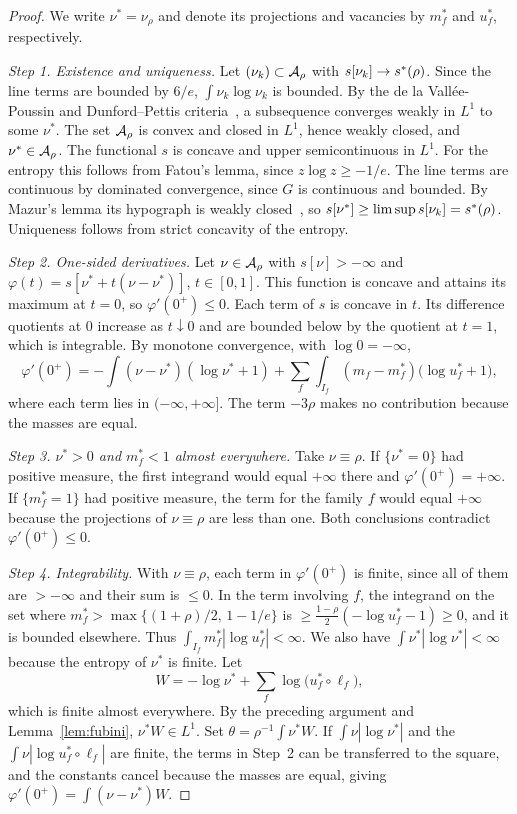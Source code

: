 \begin{proof} We write $\nu^*=\nu_\rho$ and denote its projections and vacancies by $m^*_f$ and $u^*_f$, respectively.

\emph{Step 1. Existence and uniqueness.} Let $(\nu_k)\subset{\mathcal{A}}_\rho$ with $s[\nu_k]\to s^{*}(\rho)$. Since the line terms are bounded
by $6/e$, $\int\nu_k\log\nu_k$ is bounded. By the de la Vallée-Poussin and Dunford--Pettis criteria~\cite{Bogachev}, a subsequence
converges weakly in $L^1$ to some $\nu^*$. The set ${\mathcal{A}}_\rho$ is convex and closed in $L^1$, hence weakly closed, and
$\nu^*\in{\mathcal{A}}_\rho$. The functional $s$ is concave and upper semicontinuous in $L^1$. For the entropy this follows from Fatou's lemma,
since $z\log z\ge-1/e$. The line terms are continuous by dominated convergence, since $G$ is continuous and bounded. By Mazur's lemma
its hypograph is weakly closed~\cite{Brezis}, so $s[\nu^*]\ge\limsup s[\nu_k]=s^{*}(\rho)$. Uniqueness follows from strict concavity of
the entropy.

\emph{Step 2. One-sided derivatives.} Let $\nu\in{\mathcal{A}}_\rho$ with $s[\nu]>-\infty$ and $\varphi(t)=s[\nu^*+t(\nu-\nu^*)]$, $t\in[0,1]$.
This function is concave and attains its maximum at $t=0$, so $\varphi'(0^+)\le0$. Each term of $s$ is concave in $t$. Its difference
quotients at $0$ increase as $t\downarrow0$ and are bounded below by the quotient at $t=1$, which is integrable. By monotone
convergence, with $\log0=-\infty$, \[
 \varphi'(0^+)=-\int(\nu-\nu^*)(\log\nu^*+1)+\sum_f\int_{I_f}(m_f-m^*_f)\bigl(\log u^*_f+1\bigr),
\] where each term lies in $(-\infty,+\infty]$. The term $-3\rho$ makes no contribution because the masses are equal.

\emph{Step 3. $\nu^*>0$ and $m^*_f<1$ almost everywhere.} Take $\nu\equiv\rho$. If $\{\nu^*=0\}$ had positive measure, the first
integrand would equal $+\infty$ there and $\varphi'(0^+)=+\infty$. If $\{m^*_f=1\}$ had positive measure, the term for the family $f$
would equal $+\infty$ because the projections of $\nu\equiv\rho$ are less than one. Both conclusions contradict $\varphi'(0^+)\le0$.

\emph{Step 4. Integrability.} With $\nu\equiv\rho$, each term in $\varphi'(0^+)$ is finite, since all of them are $>-\infty$ and their
sum is $\le0$. In the term involving $f$, the integrand on the set where $m^*_f>\max\{(1+\rho)/2,\,1-1/e\}$ is $\ge\frac{1-\rho}2(-\log
u^*_f-1)\ge0$, and it is bounded elsewhere. Thus $\int_{I_f}m^*_f|\log u^*_f|<\infty$. We also have $\int\nu^*|\log\nu^*|<\infty$
because the entropy of $\nu^*$ is finite. Let \[
 W=-\log\nu^*+\sum_f\log\bigl(u^*_f\circ\ell_f\bigr),
\] which is finite almost everywhere. By the preceding argument and Lemma~\ref{lem:fubini}, $\nu^*W\in L^1$. Set
$\theta=\rho^{-1}\int\nu^*W$. If $\int\nu|\log\nu^*|$ and the $\int\nu|\log u^*_f\circ\ell_f|$ are finite, the terms in Step~2 can be
transferred to the square, and the constants cancel because the masses are equal, giving $\varphi'(0^+)=\int(\nu-\nu^*)W$.


\end{proof}
